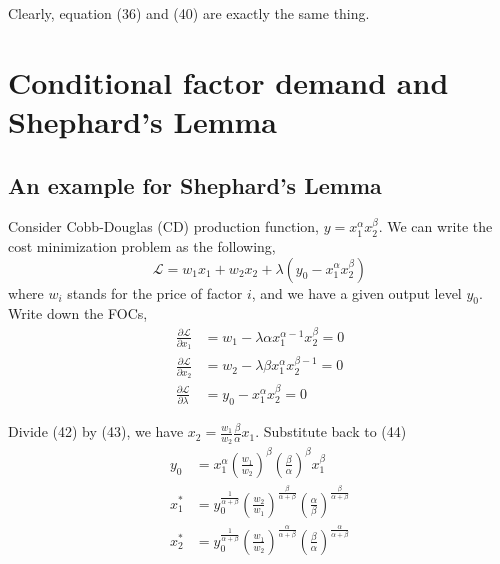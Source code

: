 \documentclass[12pt]{article}
\begin{document}
Clearly, equation (36) and (40) are exactly the same thing.




\section{Conditional factor demand and Shephard's Lemma}

\subsection{An example for Shephard's Lemma}

Consider Cobb-Douglas (CD) production function, $ y = x_1^{\alpha }x_2^{\beta } $.
We can write the cost minimization problem as the following,
\begin{equation}
				\mathscr{L} = w_1x_1 + w_2x_2 + \lambda (y_0 - x_1^{\alpha }x_2^{\beta })
\end{equation}
where $ w_{i} $ stands for the price of factor $ i $, and we have a given
output level $ y_0 $. Write down the FOCs,
\begin{align}
				\frac{\partial \mathscr{L} }{\partial x_1 }
				 &= w_1 - \lambda \alpha x_1^{\alpha  - 1}x_2^{\beta } = 0\\
				\frac{\partial \mathscr{L} }{\partial x_2 }
				 &= w_2 - \lambda \beta x_1^{\alpha }x_2^{\beta  - 1} = 0\\
				\frac{\partial \mathscr{L} }{\partial \lambda  }
				 &= y_0 - x_1^{\alpha }x_2^{\beta } = 0
\end{align}

Divide (42) by (43), we have $ x_2 = \frac{w_1}{w_2} \frac{\beta}{\alpha }x_1 $.
Substitute back to (44)
\begin{align}
				y_0 &= x_1^{\alpha }(\frac{w_1}{w_2})^{\beta }(\frac{\beta}{\alpha })^{
				\beta }x_1^{\beta }\\
				x_1^{*} &= y_0^{\frac{1}{\alpha  + \beta }}(\frac{w_2}{w_1})^{
				\frac{\beta}{\alpha  + \beta }}(\frac{\alpha}{\beta })^{\frac{\beta}{
        \alpha + \beta }}\\
				x_2^{*} &= y_0^{\frac{1}{\alpha  + \beta }}
				(\frac{w_1}{w_2})^{\frac{\alpha}{\alpha  + \beta }}
				(\frac{\beta}{\alpha})^{\frac{\alpha}{\alpha + \beta }}
\end{align}
\end{document}
